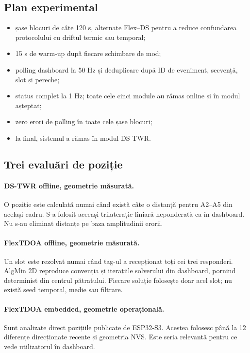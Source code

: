 \documentclass[11pt,a4paper]{article}
\begin{document}
\subsection{Plan experimental}

\begin{itemize}[leftmargin=6mm]
  \item șase blocuri de câte 120 s, alternate Flex--DS pentru a reduce
  confundarea protocolului cu driftul termic sau temporal;
  \item 15 s de warm-up după fiecare schimbare de mod;
  \item polling dashboard la 50 Hz și deduplicare după ID de eveniment,
  secvență, slot și pereche;
  \item status complet la 1 Hz; toate cele cinci module au rămas online și în
  modul așteptat;
  \item zero erori de polling în toate cele șase blocuri;
  \item la final, sistemul a rămas în modul DS-TWR.
\end{itemize}

\subsection{Trei evaluări de poziție}

\paragraph{DS-TWR offline, geometrie măsurată.}
O poziție este calculată numai când există câte o distanță pentru A2--A5 din
același cadru. S-a folosit aceeași trilaterație liniară neponderată ca în
dashboard. Nu s-au eliminat distanțe pe baza amplitudinii erorii.

\paragraph{FlexTDOA offline, geometrie măsurată.}
Un slot este rezolvat numai când tag-ul a recepționat toți cei trei responderi.
AlgMin 2D reproduce convenția și iterațiile solverului din dashboard, pornind
determinist din centrul pătratului. Fiecare soluție folosește doar acel slot;
nu există seed temporal, medie sau filtrare.

\paragraph{FlexTDOA embedded, geometrie operațională.}
Sunt analizate direct pozițiile publicate de ESP32-S3. Acestea folosesc până la
12 diferențe direcționate recente și geometria NVS. Este seria relevantă pentru
ce vede utilizatorul în dashboard.
\end{document}
